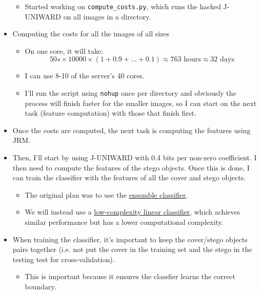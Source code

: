 \documentclass[11pt,a4paper]{report}
\begin{document}
\begin{itemize}
\begin{itemize}
  \item Started working on \texttt{compute\_costs.py}, which runs the hacked J-UNIWARD on all images in a directory.
  \end{itemize}

\item Computing the costs for all the images of all sizes
  \begin{itemize}
  \item On one core, it will take:
    \begin{equation*}
    50s \times 10000 \times (1 + 0.9 + ... + 0.1) \approx 763 \text{ hours} \approx 32 \text{ days}
    \end{equation*}
  \item I can use 8-10 of the server's 40 cores.
  \item I'll run the script using \texttt{nohup} once per directory and obviously the process will finish faster for the smaller images, so I can start on the next task (feature computation) with those that finish first.
  \end{itemize}

\item Once the costs are computed, the next task is computing the features using JRM.

\item Then, I'll start by using J-UNIWARD with 0.4 bits per non-zero coefficient. I then need to compute the features of the stego objects. Once this is done, I can train the classifier with the features of all the cover and stego objects.
  \begin{itemize}
  \item The original plan was to use the \href{http://dde.binghamton.edu/download/ensemble/}{ensemble classifier}.
  \item We will instead use a \href{http://dde.binghamton.edu/download/LCLSMR/}{low-complexity linear classifier}, which achieves similar performance but has a lower computational complexity.
  \end{itemize}

\item When training the classifier, it's important to keep the cover/stego objects pairs together (i.e. not put the cover in the training set and the stego in the testing test for cross-validation).
  \begin{itemize}
  \item This is important because it ensures the classfier learns the correct boundary.
  \end{itemize}


\end{itemize}
\end{document}
